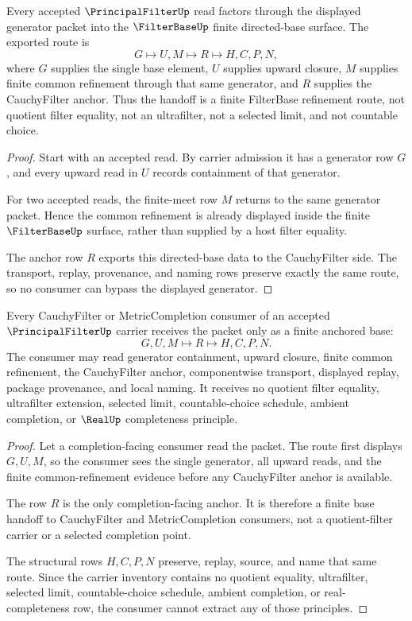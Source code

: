 \begin{theorem}
\label{thm:principal-filter-filterbase-refinement-handoff}
Every accepted $\PrincipalFilterUp$ read factors through the displayed generator packet into the $\FilterBaseUp$ finite directed-base surface. The exported route is
$$
G \longmapsto U,M \longmapsto R \longmapsto H,C,P,N ,
$$
where $G$ supplies the single base element, $U$ supplies upward closure, $M$ supplies finite common refinement through that same generator, and $R$ supplies the CauchyFilter anchor. Thus the handoff is a finite FilterBase refinement route, not quotient filter equality, not an ultrafilter, not a selected limit, and not countable choice.
\end{theorem}
\begin{proof}
Start with an accepted read. By carrier admission it has a generator row $G$, and every upward read in $U$ records containment of that generator.

For two accepted reads, the finite-meet row $M$ returns to the same generator packet. Hence the common refinement is already displayed inside the finite $\FilterBaseUp$ surface, rather than supplied by a host filter equality.

The anchor row $R$ exports this directed-base data to the CauchyFilter side. The transport, replay, provenance, and naming rows preserve exactly the same route, so no consumer can bypass the displayed generator.
\end{proof}

\begin{theorem}
\label{thm:principal-filter-cauchyfilter-anchor}
Every CauchyFilter or MetricCompletion consumer of an accepted $\PrincipalFilterUp$ carrier receives the packet only as a finite anchored base:
$$
G,U,M \longmapsto R \longmapsto H,C,P,N .
$$
The consumer may read generator containment, upward closure, finite common refinement, the CauchyFilter anchor, componentwise transport, displayed replay, package provenance, and local naming. It receives no quotient filter equality, ultrafilter extension, selected limit, countable-choice schedule, ambient completion, or $\RealUp$ completeness principle.
\end{theorem}
\begin{proof}
Let a completion-facing consumer read the packet. The route first displays $G,U,M$, so the consumer sees the single generator, all upward reads, and the finite common-refinement evidence before any CauchyFilter anchor is available.

The row $R$ is the only completion-facing anchor. It is therefore a finite base handoff to CauchyFilter and MetricCompletion consumers, not a quotient-filter carrier or a selected completion point.

The structural rows $H,C,P,N$ preserve, replay, source, and name that same route. Since the carrier inventory contains no quotient equality, ultrafilter, selected limit, countable-choice schedule, ambient completion, or real-completeness row, the consumer cannot extract any of those principles.
\end{proof}

